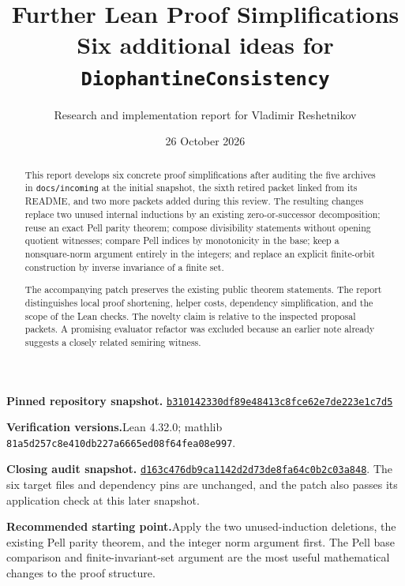 \documentclass[11pt,letterpaper]{article}
\title{\color{ink}\sffamily Further Lean Proof Simplifications\\[0.35em]
  \large Six additional ideas for \texttt{DiophantineConsistency}}
\author{Research and implementation report for Vladimir Reshetnikov}
\date{26 October 2026}
\newcommand{\code}[1]{\nolinkurl{#1}}
\begin{document}
\maketitle
\thispagestyle{empty}

\begin{abstract}
This report develops six concrete proof simplifications after auditing the five
archives in \code{docs/incoming} at the initial snapshot, the sixth retired
packet linked from its README, and two more packets added during this review.
The resulting changes replace two
unused internal inductions by an existing zero-or-successor decomposition;
reuse an exact Pell parity theorem; compose divisibility statements without
opening quotient witnesses; compare Pell indices by monotonicity in the base;
keep a nonsquare-norm argument entirely in the integers; and replace an explicit
finite-orbit construction by inverse invariance of a finite set.

The accompanying patch preserves the existing public theorem statements.
The report distinguishes local proof shortening, helper costs, dependency
simplification, and the scope of the Lean checks. The novelty claim is relative
to the inspected proposal packets. A promising evaluator refactor was excluded
because an earlier note already suggests a closely related semiring witness.
\end{abstract}

\vspace{0.4em}
\textbf{Pinned repository snapshot.}\quad
\href{https://github.com/VladimirReshetnikov/ProveIt/commit/b310142330df89e48413c8fce62e7de223e1c7d5}{\code{b310142330df89e48413c8fce62e7de223e1c7d5}}

\textbf{Verification versions.}\quad Lean 4.32.0; mathlib
\code{81a5d257c8e410db227a6665ed08f64fea08e997}.

\textbf{Closing audit snapshot.}\quad
\href{https://github.com/VladimirReshetnikov/ProveIt/commit/d163c476db9ca1142d2d73de8fa64c0b2c03a848}{\code{d163c476db9ca1142d2d73de8fa64c0b2c03a848}}.
The six target files and dependency pins are unchanged, and the patch also
passes its application check at this later snapshot.

\textbf{Recommended starting point.}\quad Apply the two unused-induction
deletions, the existing Pell parity theorem, and the integer norm argument
first. The Pell base comparison and finite-invariant-set argument are the most
useful mathematical changes to the proof structure.

\newpage
\setcounter{tocdepth}{1}
\tableofcontents
\newpage
\end{document}
